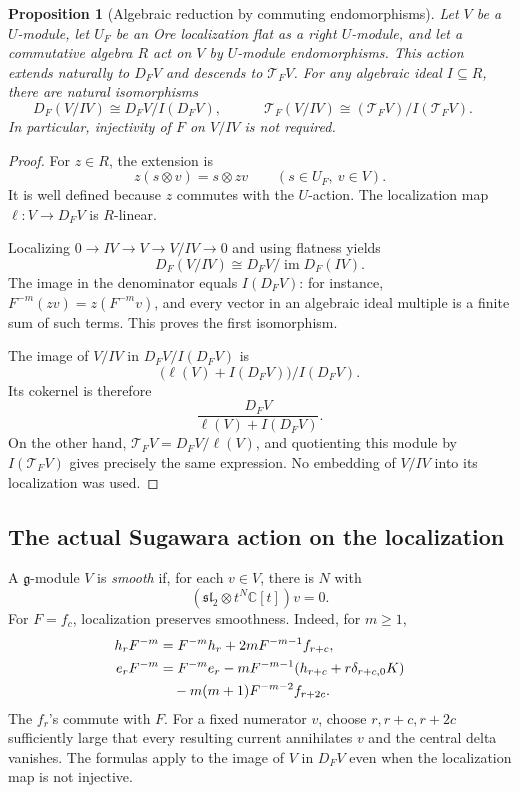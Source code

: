 \documentclass[11pt,a4paper]{article}
\newcommand{\C}{\mathbb C}
\newcommand{\g}{\mathfrak g}
\newcommand{\slc}{\mathfrak{sl}_2}
\newcommand{\T}{\mathcal T}
\theoremstyle{plainupright}
\newtheorem{proposition}[theorem]{Proposition}
\begin{document}
\begin{proposition}[Algebraic reduction by commuting endomorphisms]
\label{prop:reduction}
Let \(V\) be a \(U\)-module, let \(U_F\) be an Ore localization flat
as a right \(U\)-module, and let a commutative algebra \(R\) act on
\(V\) by \(U\)-module endomorphisms. This action extends naturally
to \(D_FV\) and descends to \(\T_FV\).
For any algebraic ideal \(I\subseteq R\), there are natural
isomorphisms
\[
D_F(V/IV)\cong D_FV/I(D_FV),
\qquad
\boxed{\quad
\T_F(V/IV)\cong(\T_FV)/I(\T_FV).
\quad}
\]
In particular, injectivity of \(F\) on \(V/IV\) is not required.
\end{proposition}
\begin{proof}
For \(z\in R\), the extension is
\[
z(s\otimes v)=s\otimes zv\qquad(s\in U_F,\ v\in V).
\]
It is well defined because \(z\) commutes with the \(U\)-action.
The localization map \(\ell:V\to D_FV\) is \(R\)-linear.

Localizing \(0\to IV\to V\to V/IV\to0\) and using flatness yields
\[
D_F(V/IV)\cong D_FV/\operatorname{im}D_F(IV).
\]
The image in the denominator equals \(I(D_FV)\): for instance,
\(F^{-m}(zv)=z(F^{-m}v)\), and every vector in an algebraic ideal
multiple is a finite sum of such terms.
This proves the first isomorphism.

The image of \(V/IV\) in \(D_FV/I(D_FV)\) is
\[
\bigl(\ell(V)+I(D_FV)\bigr)/I(D_FV).
\]
Its cokernel is therefore
\[
\frac{D_FV}{\ell(V)+I(D_FV)}.
\]
On the other hand, \(\T_FV=D_FV/\ell(V)\), and quotienting this
module by \(I(\T_FV)\) gives precisely the same expression.
No embedding of \(V/IV\) into its localization was used.
\end{proof}

\subsection{The actual Sugawara action on the localization}

A \(\g\)-module \(V\) is \emph{smooth} if, for each \(v\in V\),
there is \(N\) with
\[
(\slc\otimes t^N\C[t])v=0.
\]
For \(F=f_c\), localization preserves smoothness.
Indeed, for \(m\ge1\),
\begin{align}
h_rF^{-m}
&=F^{-m}h_r+2mF^{-m-1}f_{r+c},\label{eq:smooth-h}\\
e_rF^{-m}
&=F^{-m}e_r
-mF^{-m-1}(h_{r+c}+r\delta_{r+c,0}K)\notag\\
&\quad-m(m+1)F^{-m-2}f_{r+2c}.\label{eq:smooth-e}
\end{align}
The \(f_r\)'s commute with \(F\). For a fixed numerator \(v\), choose
\(r,r+c,r+2c\) sufficiently large that every resulting current
annihilates \(v\) and the central delta vanishes.
The formulas apply to the image of \(V\) in \(D_FV\) even when the
localization map is not injective.
\end{document}
